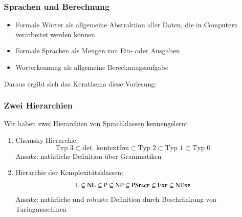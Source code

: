 \documentclass[onlymath]{beamer}
\begin{document}
\maketitle



\begin{frame}\frametitle{Sprachen und Berechnung}

\begin{itemize}
\item Formale Wörter als allgemeine Abstraktion aller Daten, die in Computern verarbeitet werden können
\item Formale Sprachen als Mengen von Ein- oder Ausgaben
\item Worterkennung als allgemeine Berechnungsaufgabe
\end{itemize}


Daraus ergibt sich das Kernthema diese Vorlesung:\\[2ex]


\end{frame}

\begin{frame}\frametitle{Zwei Hierarchien}

Wir haben zwei Hierarchien von Sprachklassen kennengelernt\bigskip

\begin{enumerate}[(1)]
\item \alert{Chomsky-Hierarchie:}
\[ \text{Typ 3}\subset \text{det. kontextfrei}\subset\text{Typ 2}\subset\text{Typ 1}\subset\text{Typ 0}\]
Ansatz: natürliche Definition über Grammatiken
\item \alert{Hierarchie der Komplexitätsklassen:}
\[{\textsc{L}}\subseteq{\textsc{NL}}\subseteq {\textsc{P}}\subseteq{\textsc{NP}}\subseteq{\textsc{PSpace}}\subseteq {\textsc{Exp}}\subseteq {\textsc{NExp}}\]
Ansatz: natürliche und robuste Definition durch Beschränkung von Turingmaschinen
\end{enumerate}

\end{frame}
\end{document}
